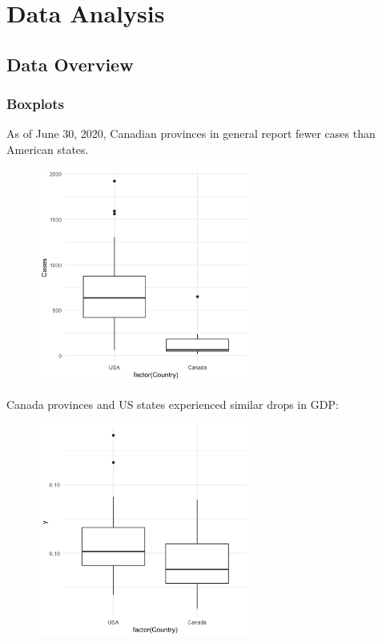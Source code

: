 \documentclass{article}
\begin{document}
\newpage
\maketitle
\section{Data Analysis}
\subsection{Data Overview}
\subsubsection{Boxplots}
\noindent As of June 30, 2020, Canadian provinces in general report fewer cases than American states.
\begin{figure}[H]
  \centering
  \includegraphics[width= 7cm]{ggplotcc.png}
  \label{fig:ggcc}
\end{figure}
Canada provinces and US states experienced similar drops in GDP:
\begin{figure}[H]
  \centering
  \includegraphics[width= 7cm]{ggplotgc.png}
  \label{fig:gggc}
\end{figure}\\
\newpage
\end{document}
